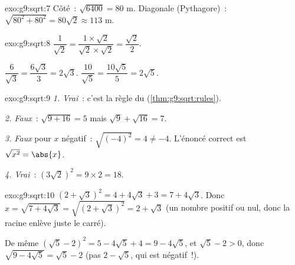 \begin{solution}{exo:g9:sqrt:7}
Côté~: $\sqrt{6400} = 80$ m. Diagonale (Pythagore)~:
$\sqrt{80^2 + 80^2} = 80\sqrt2 \approx 113$ m.
\end{solution}

\begin{solution}{exo:g9:sqrt:8}
$\dfrac{1}{\sqrt2} = \dfrac{1 \times \sqrt2}{\sqrt2 \times \sqrt2}
= \dfrac{\sqrt2}{2}$.

$\dfrac{6}{\sqrt3} = \dfrac{6\sqrt3}{3} = 2\sqrt3$.
\quad
$\dfrac{10}{\sqrt5} = \dfrac{10\sqrt5}{5} = 2\sqrt5$.
\end{solution}

\begin{solution}{exo:g9:sqrt:9}
\emph{1. Vrai}~: c'est la règle du  (\cref{thm:g9:sqrt:rules}).

\emph{2. Faux}~: $\sqrt{9 + 16} = 5$ mais $\sqrt9 + \sqrt{16} = 7$.

\emph{3. Faux} pour $x$ négatif~: $\sqrt{(-4)^2} = 4 \neq -4$. L'énoncé
correct est $\sqrt{x^2} = \abs{x}$.

\emph{4. Vrai}~: $\left(3\sqrt2\right)^2 = 9 \times 2 = 18$.
\end{solution}

\begin{solution}{exo:g9:sqrt:10}
$\left(2 + \sqrt3\right)^2 = 4 + 4\sqrt3 + 3 = 7 + 4\sqrt3$. Donc
$x = \sqrt{7 + 4\sqrt3} = \sqrt{\left(2+\sqrt3\right)^2} = 2 + \sqrt3$
(un nombre positif ou nul, donc la racine enlève juste le carré).

De même $\left(\sqrt5 - 2\right)^2 = 5 - 4\sqrt5 + 4 = 9 - 4\sqrt5$,
et $\sqrt5 - 2 > 0$, donc
$\sqrt{9 - 4\sqrt5} = \sqrt5 - 2$ (pas $2 - \sqrt5$, qui est
négatif~!).
\end{solution}

